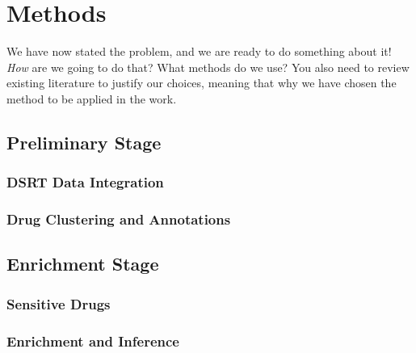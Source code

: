\chapter{Methods}
\label{chapter:methods}

We have now stated the problem, and we are ready to do something
about it!  \emph{How} are we going to do that? What methods do we
use?  You also need to review existing literature to justify our
choices, meaning that why we have chosen the method to be applied in
the work.

\section{Preliminary Stage}
\subsection{DSRT Data Integration}
\subsection{Drug Clustering and Annotations}

\section{Enrichment Stage}
\subsection{Sensitive Drugs}
\subsection{Enrichment and Inference}

